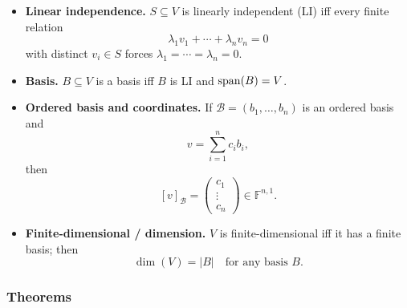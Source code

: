 \begin{itemize}[leftmargin=*]
\item \textbf{Linear independence.} $S\subseteq V$ is linearly independent (LI) iff every finite relation
\[
\lambda_1v_1+\cdots+\lambda_n v_n=0
\]
with distinct $v_i\in S$ forces $\lambda_1=\cdots=\lambda_n=0$.

\item \textbf{Basis.} $B\subseteq V$ is a basis iff $B$ is LI and $\operatorname{span}(B)=V$.

\item \textbf{Ordered basis and coordinates.} If $\mathcal B=(b_1,\dots,b_n)$ is an ordered basis and
\[
v=\sum_{i=1}^n c_i b_i,
\]
then
\[
[v]_{\mathcal B}=\begin{pmatrix}c_1\\ \vdots\\ c_n\end{pmatrix}\in\mathbb F^{n,1}.
\]

\item \textbf{Finite-dimensional / dimension.} $V$ is finite-dimensional iff it has a finite basis; then
\[
\dim(V)=|B|\quad\text{for any basis }B.
\]
\end{itemize}

\subsubsection*{Theorems}

